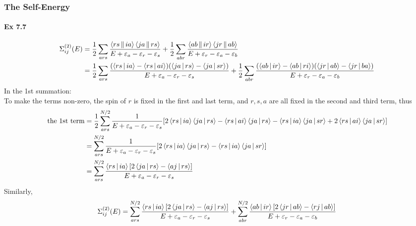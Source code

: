 \documentclass[a4paper]{article}
\newcommand{\ex}[1]{\paragraph{Ex #1}}
\numberwithin{equation}{subsection}
\begin{document}
\subsubsection{The Self-Energy}
\ex{7.7}
\begin{align}
\Sigma_{ij}^{(2)}(E) &= \dfrac{1}{2} \sum_{ars}\dfrac{\Braket{rs||ia}\Braket{ja||rs}}{E+\varepsilon_a -\varepsilon_r-\varepsilon_s} 
+ \dfrac{1}{2} \sum_{abr}\dfrac{\Braket{ab||ir}\Braket{jr||ab}}{E+\varepsilon_r -\varepsilon_a-\varepsilon_b} \notag\\
&= \dfrac{1}{2} \sum_{ars} 
\dfrac{(\Braket{rs|ia} - \Braket{rs|ai}) (\Braket{ja|rs} - \Braket{ja|sr})
}{E+\varepsilon_a -\varepsilon_r-\varepsilon_s} 
+ \dfrac{1}{2} \sum_{abr} 
\dfrac{(\Braket{ab|ir} - \Braket{ab|ri}) (\Braket{jr|ab} - \Braket{jr|ba}) }{E+\varepsilon_r -\varepsilon_a-\varepsilon_b} %
\end{align}
In the 1st summation: \\
To make the terms non-zero, the spin of $ r $ is fixed in the first and last term, and $ r,s,a $ are all fixed in the second and third term, thus
\begin{align}
\text{the 1st term} &= \dfrac{1}{2} \sum_{ars}^{N/2}
\dfrac{1}{E+\varepsilon_a -\varepsilon_r-\varepsilon_s} \qty[2\Braket{rs|ia}\Braket{ja|rs} - \Braket{rs|ai}\Braket{ja|rs} 
- \Braket{rs|ia}\Braket{ja|sr} + 2\Braket{rs|ai}\Braket{ja|sr}] \notag\\
&= \sum_{ars}^{N/2} 
\dfrac{1}{E+\varepsilon_a -\varepsilon_r-\varepsilon_s} \qty[2\Braket{rs|ia}\Braket{ja|rs} - \Braket{rs|ia}\Braket{ja|sr} ] \notag\\
&= \sum_{ars}^{N/2} 
\dfrac{\Braket{rs|ia} \qty[2\Braket{ja|rs} - \Braket{aj|rs}] }{E+\varepsilon_a -\varepsilon_r-\varepsilon_s} 
\end{align}
Similarly,
\begin{align}
\Sigma_{ij}^{(2)}(E) = \sum_{ars}^{N/2} 
\dfrac{\Braket{rs|ia} \qty[2\Braket{ja|rs} - \Braket{aj|rs}] }{E+\varepsilon_a -\varepsilon_r-\varepsilon_s} 
+ \sum_{abr}^{N/2} 
\dfrac{\Braket{ab|ir} \qty[2\Braket{jr|ab} - \Braket{rj|ab}]
}{E+\varepsilon_r -\varepsilon_a-\varepsilon_b} 
\end{align}
\end{document}
